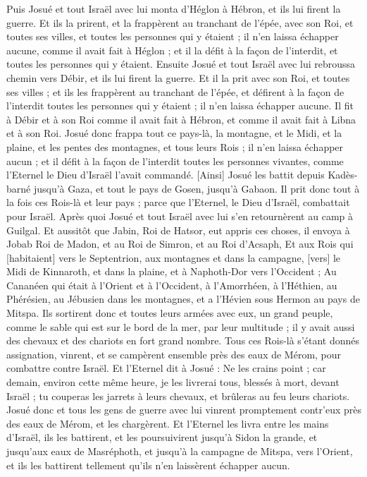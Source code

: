\begin{multicols}{2}
Puis Josué et tout Israël avec lui monta d'Héglon à Hébron, et ils lui firent la guerre.
Et ils la prirent, et la frappèrent au tranchant de l'épée, avec son Roi, et toutes ses villes, et toutes les personnes qui y étaient ; il n'en laissa échapper aucune, comme il avait fait à Héglon ; et il la défit à la façon de l'interdit, et toutes les personnes qui y étaient.
Ensuite Josué et tout Israël avec lui rebroussa chemin vers Débir, et ils lui firent la guerre.
Et il la prit avec son Roi, et toutes ses villes ; et ils les frappèrent au tranchant de l'épée, et défirent à la façon de l'interdit toutes les personnes qui y étaient ; il n'en laissa échapper aucune. Il fit à Débir et à son Roi comme il avait fait à Hébron, et comme il avait fait à Libna et à son Roi.
Josué donc frappa tout ce pays-là, la montagne, et le Midi, et la plaine, et les pentes des montagnes, et tous leurs Rois ; il n'en laissa échapper aucun ; et il défit à la façon de l'interdit toutes les personnes vivantes, comme l'Eternel le Dieu d'Israël l'avait commandé.
[Ainsi] Josué les battit depuis Kadès-barné jusqu'à Gaza, et tout le pays de Gosen, jusqu'à Gabaon.
Il prit donc tout à la fois ces Rois-là et leur pays ; parce que l'Eternel, le Dieu d'Israël, combattait pour Israël.
Après quoi Josué et tout Israël avec lui s'en retournèrent au camp à Guilgal.
\VerseOne{}Et aussitôt que Jabin, Roi de Hatsor, eut appris ces choses, il envoya à Jobab Roi de Madon, et au Roi de Simron, et au Roi d'Acsaph,
Et aux Rois qui [habitaient] vers le Septentrion, aux montagnes et dans la campagne, [vers] le Midi de Kinnaroth, et dans la plaine, et à Naphoth-Dor vers l'Occident ;
Au Cananéen qui était à l'Orient et à l'Occident, à l'Amorrhéen, à l'Héthien, au Phérésien, au Jébusien dans les montagnes, et a l'Hévien sous Hermon au pays de Mitspa.
Ils sortirent donc et toutes leurs armées avec eux, un grand peuple, comme le sable qui est sur le bord de la mer, par leur multitude ; il y avait aussi des chevaux et des chariots en fort grand nombre.
Tous ces Rois-là s'étant donnés assignation, vinrent, et se campèrent ensemble près des eaux de Mérom, pour combattre contre Israël.
Et l'Eternel dit à Josué : Ne les crains point ; car demain, environ cette même heure, je les livrerai tous, blessés à mort, devant Israël ; tu couperas les jarrets à leurs chevaux, et brûleras au feu leurs chariots.
Josué donc et tous les gens de guerre avec lui vinrent promptement contr'eux près des eaux de Mérom, et les chargèrent.
Et l'Eternel les livra entre les mains d'Israël, ils les battirent, et les poursuivirent jusqu'à Sidon la grande, et jusqu'aux eaux de Masréphoth, et jusqu'à la campagne de Mitspa, vers l'Orient, et ils les battirent tellement qu'ils n'en laissèrent échapper aucun.

\end{multicols}
